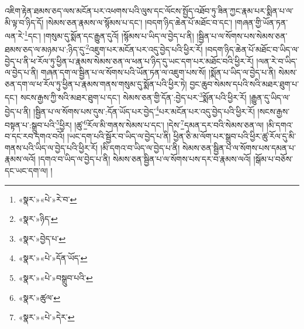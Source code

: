 འཇིག་རྟེན་ཐམས་ཅད་ལས་མངོན་པར་འཕགས་པའི་ལུས་དང་ལོངས་སྤྱོད་འཐོབ་ཏུ་ཟིན་ཀྱང་རྣམ་པར་སྨིན་པ་ལ་མི་ལྟ་བ་ཉིད་དོ། །སེམས་ཅན་རྣམས་ལ་སྙོམས་པ་དང་། །བདག་ཉིད་ཆེན་པོ་མཐོང་བ་དང་། །གཞན་གྱི་ཡོན་ཏན་ལན་རེ་\footnote{«སྣར་»«པེ་»རེ་བ་}དང་། །གསུམ་དུ་སྨོན་དང་རྒྱུན་དུའོ། །སྙོམས་པ་ཡིད་ལ་བྱེད་པ་ནི། །སྦྱིན་པ་ལ་སོགས་པས་སེམས་ཅན་ཐམས་ཅད་ལ་མཉམ་པ་:ཉིད་དུ་\footnote{«སྣར་»ཉིད་}འཇུག་པར་མངོན་པར་འདུ་བྱེད་པའི་ཕྱིར་རོ། །བདག་ཉིད་ཆེན་པོ་མཐོང་བ་ཡིད་ལ་བྱེད་པ་ནི་ཕ་རོལ་ཏུ་ཕྱིན་པ་རྣམས་སེམས་ཅན་ལ་ཕན་པ་ཉིད་དུ་ཡང་དག་པར་མཐོང་བའི་ཕྱིར་རོ། །ལན་རེ་བ་ཡིད་ལ་བྱེད་པ་ནི། གཞན་དག་ལ་སྦྱིན་པ་ལ་སོགས་པའི་ཡོན་ཏན་ལ་འཇུག་པས་སོ། །སྨོན་པ་ཡིད་ལ་བྱེད་པ་ནི། སེམས་ཅན་དག་ལ་ཕ་རོལ་ཏུ་ཕྱིན་པ་རྣམས་གནས་གསུམ་དུ་སྨོན་པའི་ཕྱིར་ཏེ། བྱང་ཆུབ་སེམས་དཔའི་སའི་མཐར་ཐུག་པ་དང་། སངས་རྒྱས་ཀྱི་སའི་མཐར་ཐུག་པ་དང་། སེམས་ཅན་གྱི་དོན་:བྱེད་པར་\footnote{«སྣར་»བྱེད་པ་}སྨོན་པའི་ཕྱིར་རོ། །རྒྱུན་དུ་ཡིད་ལ་བྱེད་པ་ནི། །སྦྱིན་པ་ལ་སོགས་པས་དུས་:དོན་ཡོད་པར་བྱེད་\footnote{«སྣར་»«པེ་»དོན་ཡོད་}པར་མངོན་པར་འདུ་བྱེད་པའི་ཕྱིར་རོ། །སངས་རྒྱས་བསྟན་པ་:སྒྲུབ་པའི་\footnote{«སྣར་»«པེ་»བསྒྲུབ་པའི་}ཕྱིར། །ཚུ་\footnote{«སྣར་»ཚུལ་}རོལ་མི་གནས་སེམས་པ་དང་། །དེས་\footnote{«སྣར་»«པེ་»དེར་}དམན་དར་བའི་སེམས་ཅན་ལ། །མི་དགའ་བ་དང་རབ་དགའ་བའོ། །ཡང་དག་པའི་སྦྱོར་བ་ཡིད་ལ་བྱེད་པ་ནི། ཕྱིན་ཅི་མ་ལོག་པར་སྒྲུབ་པའི་ཕྱིར་ཚུ་རོལ་དུ་མི་གནས་པའི་ཡིད་ལ་བྱེད་པའི་ཕྱིར་རོ། །མི་དགའ་བ་ཡིད་ལ་བྱེད་པ་ནི། སེམས་ཅན་སྦྱིན་པ་ལ་སོགས་པས་དམན་པ་རྣམས་ལའོ། །དགའ་བ་ཡིད་ལ་བྱེད་པ་ནི། སེམས་ཅན་སྦྱིན་པ་ལ་སོགས་པས་དར་བ་རྣམས་ལའོ། །སྒོམ་པ་བཅོས་དང་ཡང་དག་ལ། །
